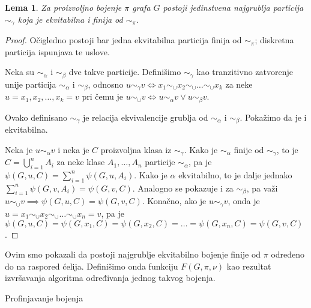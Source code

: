 \documentclass[12pt,oneside]{memoir}
\newtheorem{lemma}{Lema}
\theoremstyle{definition}
\begin{document}
  \begin{lemma}
	  \label{lemma:coarsesteq}
	  Za proizvoljno bojenje $\pi$ grafa $G$ postoji jedinstvena najgrublja
	  particija $\sim_\gamma$ koja je ekvitabilna i finija od $\sim_\pi$.
  \end{lemma}

  \begin{proof}
	  Očigledno postoji bar jedna ekvitabilna particija finija od $\sim_\pi$;
	  diskretna particija ispunjava te uslove.

	  Neka su $\sim_\alpha$ i $\sim_\beta$ dve takve particije. Definišimo
	  $\sim_\gamma$ kao tranzitivno zatvorenje unije particija $\sim_\alpha$ i
	  $\sim_\beta$, odnosno $u \sim_\gamma v \iff x_1 \sim_\cup x_2 \sim_\cup
	  \dots \sim_\cup x_k$ za neke $u = x_1, x_2, \dots, x_k = v$ pri čemu je
	  $u \sim_\cup v \iff u \sim_\alpha v \lor u \sim_\beta v$.

	  Ovako definisano $\sim_\gamma$ je relacija ekvivalencije grublja od
	  $\sim_\alpha$ i $\sim_\beta$. Pokažimo da je i ekvitabilna.

	  Neka je $u \sim_\alpha v$ i neka je $C$ proizvoljna klasa iz
	  $\sim_\gamma$. Kako je $\sim_\alpha$ finije od $\sim_\gamma$, to je $C =
	  \bigcup_{i=1}^n A_i$ za neke klase $A_1, \dots, A_n$ particije
	  $\sim_\alpha$, pa je $\psi(G, u, C) = \sum_{i=1}^n \psi(G, u, A_i)$. Kako
	  je $\alpha$ ekvitabilno, to je dalje jednako $\sum_{i=1}^n \psi(G, v,
	  A_i) = \psi(G, v, C)$. Analogno se pokazuje i za $\sim_\beta$, pa važi $u
	  \sim_\cup v \implies \psi(G, u, C) = \psi(G, v, C)$.  Konačno, ako je $u
	  \sim_\gamma v$, onda je $u = x_1 \sim_\cup x_2 \sim_\cup \dots \sim_\cup x_n = v$, pa
	  je $\psi(G, u, C) = \psi(G, x_1, C) = \psi(G, x_2, C) = \dots = \psi(G,
	  x_n, C) = \psi(G, v, C)$.
  \end{proof}
  
  Ovim smo pokazali da postoji najgrublje ekvitabilno bojenje finije od $\pi$
  određeno do na raspored ćelija. Definišimo onda funkciju $F(G, \pi, \nu)$ kao
  rezultat izvršavanja algoritma određivanja jednog takvog bojenja.

  \begin{algorithm}[H]
	  \caption{Profinjavanje bojenja}
	  \begin{algorithmic}[1]
		  \State {$\alpha \gets \emptyset$}
		  \Else
		  \EndIf
		  \While{$\alpha \neq \emptyset$}
			  \Else
			  \EndIf
			\EndFor
		  \EndWhile
		  \State \Return{$\pi$}
		  \EndProcedure
	  \end{algorithmic}
  \end{algorithm}
\end{document}

